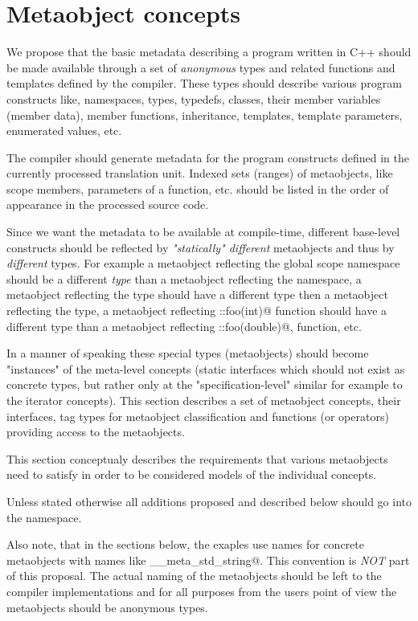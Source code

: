 \section{Metaobject concepts}

We propose that the basic metadata describing a program written
in C++ should be made available through a set of {\em anonymous} types
and related functions and templates
defined by the compiler. These types should describe various program
constructs like, namespaces, types, typedefs, classes, their member variables
(member data), member functions, inheritance, templates, template parameters,
enumerated values, etc.

The compiler should generate metadata for the program constructs defined
in the currently processed translation unit. Indexed sets (ranges) of metaobjects,
like scope members, parameters of a function, etc. should be listed
in the order of appearance in the processed source code.

Since we want the metadata to be available at compile-time,
different base-level constructs should be reflected by
{\em "statically" different} metaobjects and thus by {\em different} types.
For example a metaobject reflecting the global scope namespace should
be a different {\em type} than a metaobject reflecting the \verb@std@
namespace, a metaobject reflecting the \verb@int@ type should
have a different type then a metaobject reflecting the \verb@double@
type, a metaobject reflecting \verb@::foo(int)@ function should
have a different type than a metaobject reflecting \verb@::foo(double)@,
function, etc.

In a manner of speaking these special types (metaobjects) should become
"instances" of the meta-level concepts (static interfaces which
should not exist as concrete types, but rather only at the
"specification-level" similar for example to the iterator concepts).
This section describes a set of metaobject concepts,
their interfaces, tag types for metaobject classification and
functions (or operators) providing access to the metaobjects.

This section conceptualy describes the requirements that various metaobjects
need to satisfy in order to be considered models of the individual
concepts.

Unless stated otherwise all additions proposed and described below should
go into the \verb@std@ namespace.

Also note, that in the sections below, the exaples use names for concrete
metaobjects with names like \verb@__meta_std_string@. This convention
is {\em NOT} part of this proposal. The actual naming of the metaobjects
should be left to the compiler implementations and for all purposes
from the users point of view the metaobjects should be anonymous types.









